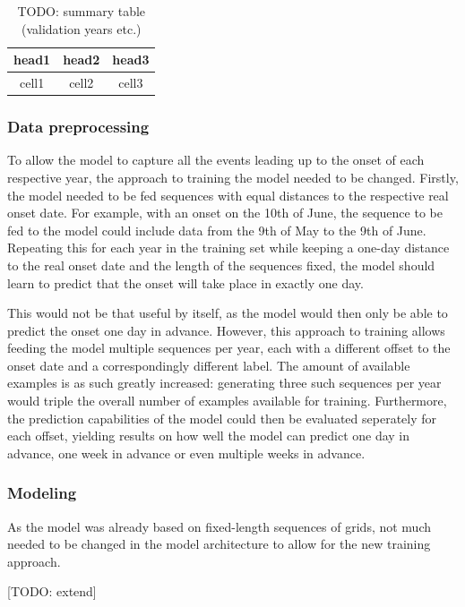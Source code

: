 \begin{table}[h]
  \centering
  \begin{tabular}{ |c|c|c| }
    \hline
    head1 & head2 & head3 \\
    \hline
    cell1 & cell2 & cell3 \\
    \hline
  \end{tabular}
  \caption{TODO: summary table (validation years etc.)}
  \label{tab:nn_e4_summary}
\end{table}

\subsubsection{Data preprocessing}
\label{ssst:nn_e4_data}
To allow the model to capture all the events leading up to the onset of each respective year, the approach to training the model needed to be changed. Firstly, the model needed to be fed sequences with equal distances to the respective real onset date. For example, with an onset on the 10th of June, the sequence to be fed to the model could include data from the 9th of May to the 9th of June. Repeating this for each year in the training set while keeping a one-day distance to the real onset date and the length of the sequences fixed, the model should learn to predict that the onset will take place in exactly one day.

This would not be that useful by itself, as the model would then only be able to predict the onset one day in advance. However, this approach to training allows feeding the model multiple sequences per year, each with a different offset to the onset date and a correspondingly different label. The amount of available examples is as such greatly increased: generating three such sequences per year would triple the overall number of examples available for training. Furthermore, the prediction capabilities of the model could then be evaluated seperately for each offset, yielding results on how well the model can predict one day in advance, one week in advance or even multiple weeks in advance.

\subsubsection{Modeling}
\label{ssst:nn_e4_modeling}
As the model was already based on fixed-length sequences of grids, not much needed to be changed in the model architecture to allow for the new training approach.

[TODO: extend]

